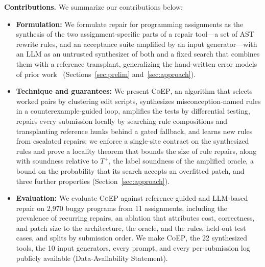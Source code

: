 \documentclass[acmsmall,screen,review,anonymous,nonacm]{acmart}
\newcommand{\tool}{\textsc{CoEP}\xspace}
\begin{document}
\textbf{Contributions.} We summarize our contributions below:
\begin{itemize}
  \item \textbf{Formulation:} We formulate repair for programming assignments as the synthesis of the two assignment-specific parts of a repair tool---a set of AST rewrite rules, and an acceptance suite amplified by an input generator---with an LLM as an untrusted synthesizer of both and a fixed search that combines them with a reference transplant, generalizing the hand-written error models of prior work~\cite{singh2013automated} (Sections~\ref{sec:prelim} and~\ref{sec:approach}).
  \item \textbf{Technique and guarantees:} We present \tool, an algorithm that selects worked pairs by clustering edit scripts, synthesizes misconception-named rules in a counterexample-guided loop, amplifies the tests by differential testing, repairs every submission locally by searching rule compositions and transplanting reference hunks behind a gated fallback, and learns new rules from escalated repairs; we enforce a single-site contract on the synthesized rules and prove a locality theorem that bounds the size of rule repairs, along with soundness relative to $T^{+}$, the label soundness of the amplified oracle, a bound on the probability that its search accepts an overfitted patch, and three further properties (Section~\ref{sec:approach}).
  \item \textbf{Evaluation:} We evaluate \tool against reference-guided and LLM-based repair on 2{,}970 buggy programs from 11 assignments, including the prevalence of recurring repairs, an ablation that attributes cost, correctness, and patch size to the architecture, the oracle, and the rules, held-out test cases, and splits by submission order. We make \tool, the 22 synthesized tools, the 10 input generators, every prompt, and every per-submission log publicly available (Data-Availability Statement).
\end{itemize}
\end{document}
